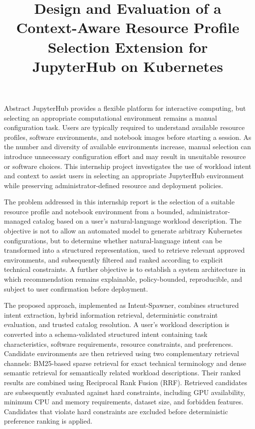 \documentclass{uetgraduation}
\begin{document}
\title{Design and Evaluation of a Context-Aware Resource Profile Selection Extension for JupyterHub on Kubernetes}
\makecovers
{}
\begin{preamble}{Abstract}
JupyterHub provides a flexible platform for interactive computing, but selecting an appropriate computational environment remains a manual configuration task. Users are typically required to understand available resource profiles, software environments, and notebook images before starting a session. As the number and diversity of available environments increase, manual selection can introduce unnecessary configuration effort and may result in unsuitable resource or software choices. This internship project investigates the use of workload intent and context to assist users in selecting an appropriate JupyterHub environment while preserving administrator-defined resource and deployment policies.

The problem addressed in this internship report is the selection of a suitable resource profile and notebook environment from a bounded, administrator-managed catalog based on a user's natural-language workload description. The objective is not to allow an automated model to generate arbitrary Kubernetes configurations, but to determine whether natural-language intent can be transformed into a structured representation, used to retrieve relevant approved environments, and subsequently filtered and ranked according to explicit technical constraints. A further objective is to establish a system architecture in which recommendation remains explainable, policy-bounded, reproducible, and subject to user confirmation before deployment.

The proposed approach, implemented as Intent-Spawner, combines structured intent extraction, hybrid information retrieval, deterministic constraint evaluation, and trusted catalog resolution. A user's workload description is converted into a schema-validated structured intent containing task characteristics, software requirements, resource constraints, and preferences. Candidate environments are then retrieved using two complementary retrieval channels: BM25-based sparse retrieval for exact technical terminology and dense semantic retrieval for semantically related workload descriptions. Their ranked results are combined using Reciprocal Rank Fusion (RRF). Retrieved candidates are subsequently evaluated against hard constraints, including GPU availability, minimum CPU and memory requirements, dataset size, and forbidden features. Candidates that violate hard constraints are excluded before deterministic preference ranking is applied.


\end{preamble}
\end{document}
